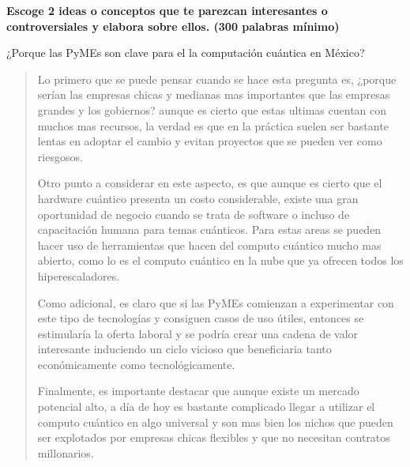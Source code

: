 \textbf{Escoge 2 ideas o conceptos que te parezcan interesantes o controversiales y elabora sobre ellos. (300 palabras mínimo)}\vspace{.2cm}

\textcolor{bibi}{¿Porque las PyMEs son clave para el la computación cuántica en México?}
\begin{quote}
	Lo primero que se puede pensar cuando se hace esta pregunta es, ¿porque serían las empresas chicas y medianas mas importantes que las empresas grandes y los gobiernos? aunque es cierto que estas ultimas cuentan con muchos mas recursos, la verdad es que en la práctica suelen ser bastante lentas en adoptar el cambio y evitan proyectos que se pueden ver como riesgosos. \vspace{.3cm}

	Otro punto a considerar en este aspecto, es que aunque es cierto que el hardware cuántico presenta un costo considerable, existe una gran oportunidad de negocio cuando se trata de software o incluso de capacitación humana para temas cuánticos. Para estas areas se pueden hacer uso de herramientas que hacen del computo cuántico mucho mas abierto, como lo es el computo cuántico en la nube que ya ofrecen todos los hiperescaladores. \vspace{.3cm}

	Como adicional, es claro que si las PyMEs comienzan a experimentar con este tipo de tecnologías y consiguen casos de uso útiles, entonces se estimularía la oferta laboral y se podría crear una cadena de valor interesante induciendo un ciclo vicioso que beneficiaria tanto económicamente como tecnológicamente. \vspace{.3cm}

	Finalmente, es importante destacar que aunque existe un mercado potencial alto, a día de hoy es bastante complicado llegar a utilizar el computo cuántico en algo universal y son mas bien los nichos que pueden ser explotados por empresas chicas flexibles y que no necesitan contratos millonarios.
\end{quote}



